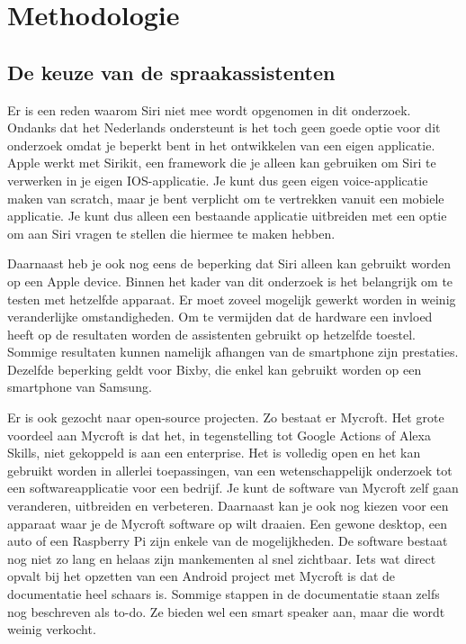
\chapter{Methodologie}
\label{ch:methodologie}

\section{De keuze van de spraakassistenten}
Er is een reden waarom Siri niet mee wordt opgenomen in dit onderzoek. Ondanks dat het Nederlands ondersteunt is het toch geen goede optie voor dit onderzoek omdat je beperkt bent in het ontwikkelen van een eigen applicatie. Apple werkt met Sirikit, een framework die je alleen kan gebruiken om Siri te verwerken in je eigen IOS-applicatie. Je kunt dus geen eigen voice-applicatie maken van scratch, maar je bent verplicht om te vertrekken vanuit een mobiele applicatie. Je kunt dus alleen een bestaande applicatie uitbreiden met een optie om aan Siri vragen te stellen die hiermee te maken hebben.

Daarnaast heb je ook nog eens de beperking dat Siri alleen kan gebruikt worden op een Apple device. Binnen het kader van dit onderzoek is het belangrijk om te testen met hetzelfde apparaat. Er moet zoveel mogelijk gewerkt worden in weinig veranderlijke omstandigheden. Om te vermijden dat de hardware een invloed heeft op de resultaten worden de assistenten gebruikt op hetzelfde toestel. Sommige resultaten kunnen namelijk afhangen van de smartphone zijn prestaties. Dezelfde beperking geldt voor Bixby, die enkel kan gebruikt worden op een smartphone van Samsung.

Er is ook gezocht naar open-source projecten. Zo bestaat er Mycroft. Het grote voordeel aan Mycroft is dat het, in tegenstelling tot Google Actions of Alexa Skills, niet gekoppeld is aan een enterprise. Het is volledig open en het kan gebruikt worden in allerlei toepassingen, van een wetenschappelijk onderzoek tot een softwareapplicatie voor een bedrijf. Je kunt de software van Mycroft zelf gaan veranderen, uitbreiden en verbeteren. Daarnaast kan je ook nog kiezen voor een apparaat waar je de Mycroft software op wilt draaien. Een gewone desktop, een auto of een Raspberry Pi zijn enkele van de mogelijkheden.
De software bestaat nog niet zo lang en helaas zijn mankementen al snel zichtbaar. Iets wat direct opvalt bij het opzetten van een Android project met Mycroft is dat de documentatie heel schaars is. Sommige stappen in de documentatie staan zelfs nog beschreven als to-do. Ze bieden wel een smart speaker aan, maar die wordt weinig verkocht.

